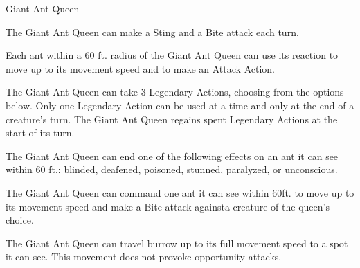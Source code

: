 \begin{DndMonster}[float*=b, width=\textwidth +8pt]{Giant Ant Queen}
\begin{multicols}{2}
	The Giant Ant Queen can make a Sting and a Bite attack each turn.
	
	\DndMonsterAttack[
      name=Bite,
      distance=melee, %
      mod=+11,
      reach=10,
      targets=one target,
      dmg=\DndDice{4d10 + 7},
      dmg-type=piercing,
      extra={. The target must make a DC 18 Constitution Saving throw, taking \DndDice{2d6} poison damage on a failed save, or half as much on a successful one},
    ]
    
    \DndMonsterAttack[
      name=Sting,
      distance=melee, %
      mod=+11,
      reach=10,
      targets=one target,
      dmg=\DndDice{4d4 + 7},
      dmg-type=piercing,
      extra={. The target must make a DC 18 Constitution Saving throw, taking \DndDice{8d6} poison damage on a failed save, or half as much on a successful one},
    ]
    
	Each ant within a 60 ft. radius of the Giant Ant Queen can use its reaction to move up to its movement speed and to make an Attack Action.
    
    The Giant Ant Queen can take 3 Legendary Actions, choosing from the options below. Only one Legendary Action can be used at a time and only at the end of a creature's turn. The Giant Ant Queen regains spent Legendary Actions at the start of its turn.
    
    The Giant Ant Queen can end one of the following effects on an ant it can see within 60 ft.: blinded, deafened, poisoned, stunned, paralyzed, or unconscious.
    
    The Giant Ant Queen can command one ant it can see within 60ft. to move up to its movement speed and make a Bite attack againsta creature of the queen's choice.
    
    The Giant Ant Queen can travel burrow up to its full movement speed to a spot it can see. This movement does not provoke opportunity attacks.
      
\end{multicols}\end{DndMonster}

